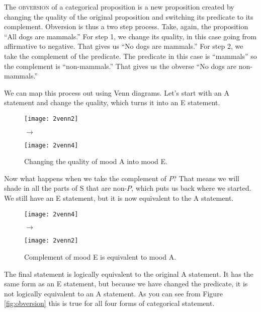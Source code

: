 The \textsc{\gls{obversion}} \label{def:obversion} of a categorical proposition is a new proposition created by changing the quality of the original proposition and switching its predicate to its complement. Obversion is thus a two step process. Take, again, the proposition ``All dogs are mammals.'' For step 1, we change its quality, in this case going from affirmative to negative. That gives us ``No dogs are mammals.'' For step 2, we take the complement of the predicate. The predicate in this case is ``mammals'' so the complement is ``non-mammals.'' That gives us the obverse ``No dogs are non-mammals.''

We can map this process out using Venn diagrams. Let's start with an A statement and change the quality, which turns it into an E statement.

\begin{figure}[!ht]
\texttt{[image: 2venn2]}
\begin{minipage}[c]{0.1\textwidth}\vspace{-2.5cm}\hspace{.4cm}$\to$\end{minipage}
\texttt{[image: 2venn4]}
\caption{Changing the quality of mood A into mood E.}
\label{fig:obversion_step1}
\end{figure}

Now what happens when we take the complement of $P$? That means we will shade in all the parts of S that are non-$P$, which puts us back where we started. We still have an E statement, but it is now equivalent to the A statement.

\begin{figure}[!ht]
\texttt{[image: 2venn4]}
\begin{minipage}[c]{0.1\textwidth}\vspace{-2.5cm}\hspace{.4cm}$\to$\end{minipage}
\texttt{[image: 2venn2]}
\caption{Complement of mood E is equivalent to mood A.}
\label{fig:obversion_step2}
\end{figure}

The final statement is logically equivalent to the original A statement. It has the same form as an E statement, but because we have changed the predicate, it is not logically equivalent to an A statement. As you can see from Figure \ref{fig:obversion} this is true for all four forms of categorical statement.


